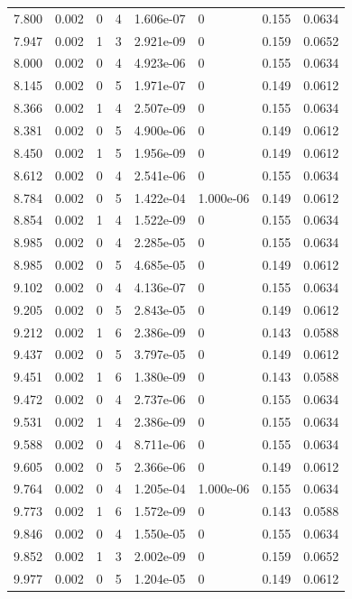 \documentclass[preview]{standalone}
\begin{document}
{{{\begin{tabular}{L{1.2cm}C{1.2cm} C{0.3cm}C{0.5cm} C{1.4cm}C{1.4cm} C{1.4cm}C{1.4cm}}
  7.800  &  0.002  & 0     &  4 &  1.606e-07  & 0  & 0.155 &  0.0634   \\ 
  7.947  &  0.002  & 1     &  3 &  2.921e-09  & 0  & 0.159 &  0.0652   \\ 
  8.000  &  0.002  & 0     &  4 &  4.923e-06  & 0  & 0.155 &  0.0634   \\ 
  8.145  &  0.002  & 0     &  5 &  1.971e-07  & 0  & 0.149 &  0.0612   \\ 
  8.366  &  0.002  & 1     &  4 &  2.507e-09  & 0  & 0.155 &  0.0634   \\ 
  8.381  &  0.002  & 0     &  5 &  4.900e-06  & 0  & 0.149 &  0.0612   \\ 
  8.450  &  0.002  & 1     &  5 &  1.956e-09  & 0  & 0.149 &  0.0612   \\ 
  8.612  &  0.002  & 0     &  4 &  2.541e-06  & 0  & 0.155 &  0.0634   \\ 
  8.784  &  0.002  & 0     &  5 &  1.422e-04  & 1.000e-06  & 0.149 &  0.0612   \\ 
  8.854  &  0.002  & 1     &  4 &  1.522e-09  & 0  & 0.155 &  0.0634   \\ 
  8.985  &  0.002  & 0     &  4 &  2.285e-05  & 0  & 0.155 &  0.0634   \\ 
  8.985  &  0.002  & 0     &  5 &  4.685e-05  & 0  & 0.149 &  0.0612   \\ 
  9.102  &  0.002  & 0     &  4 &  4.136e-07  & 0  & 0.155 &  0.0634   \\ 
  9.205  &  0.002  & 0     &  5 &  2.843e-05  & 0  & 0.149 &  0.0612   \\ 
  9.212  &  0.002  & 1     &  6 &  2.386e-09  & 0  & 0.143 &  0.0588   \\ 
  9.437  &  0.002  & 0     &  5 &  3.797e-05  & 0  & 0.149 &  0.0612   \\ 
  9.451  &  0.002  & 1     &  6 &  1.380e-09  & 0  & 0.143 &  0.0588   \\ 
  9.472  &  0.002  & 0     &  4 &  2.737e-06  & 0  & 0.155 &  0.0634   \\ 
  9.531  &  0.002  & 1     &  4 &  2.386e-09  & 0  & 0.155 &  0.0634   \\ 
  9.588  &  0.002  & 0     &  4 &  8.711e-06  & 0  & 0.155 &  0.0634   \\ 
  9.605  &  0.002  & 0     &  5 &  2.366e-06  & 0  & 0.149 &  0.0612   \\ 
  9.764  &  0.002  & 0     &  4 &  1.205e-04  & 1.000e-06  & 0.155 &  0.0634   \\ 
  9.773  &  0.002  & 1     &  6 &  1.572e-09  & 0  & 0.143 &  0.0588   \\ 
  9.846  &  0.002  & 0     &  4 &  1.550e-05  & 0  & 0.155 &  0.0634   \\ 
  9.852  &  0.002  & 1     &  3 &  2.002e-09  & 0  & 0.159 &  0.0652   \\ 
  9.977  &  0.002  & 0     &  5 &  1.204e-05  & 0  & 0.149 &  0.0612   \\ 
\hline 
\end{tabular} 

}}}
\end{document}
